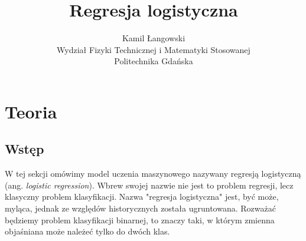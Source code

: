 \documentclass[a4paper]{article}
\title{Regresja logistyczna}
\author{Kamil Łangowski \\ Wydział Fizyki Technicznej i Matematyki Stosowanej \\ Politechnika Gdańska}
\begin{document}
\maketitle
\newpage
\section{Teoria}
\subsection{Wstęp}
W tej sekcji omówimy model uczenia maszynowego nazywany regresją logistyczną (ang. \textit{logistic regression}). Wbrew swojej nazwie nie jest to problem regresji, lecz klasyczny problem klasyfikacji. Nazwa "regresja logistyczna" jest, być może, myląca, jednak ze względów historycznych została ugruntowana. Rozważać będziemy problem klasyfikacji binarnej, to znaczy taki, w którym zmienna objaśniana może należeć tylko do dwóch klas. 
\end{document}
